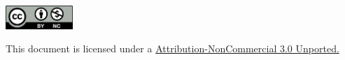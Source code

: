 \documentclass[a4paper,10pt]{article}
\begin{document}

\doublespacing

\tableofcontents %

\vspace{4cm}
\begin{center}
\leavevmode
\includegraphics[width=1in]{img/by-nc.png}
\end{center}
\label{fig:cc}
\begin{center}
\scriptsize{This document is licensed under a \href{http://creativecommons.org/licenses/by-nc/3.0/}{Attribution-NonCommercial 3.0 Unported.}}
\end{center}
\clearpage







\doublespacing

\pagebreak



\end{document}
